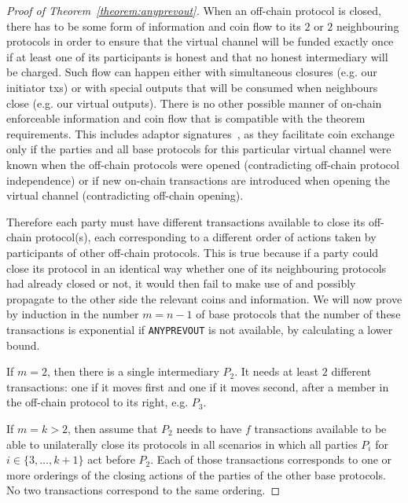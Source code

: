   \begin{proof}[Proof of Theorem~\ref{theorem:anyprevout}]
    When an off-chain protocol is closed, there has to be some form of
    information and coin flow to its $2$ or $2$ neighbouring protocols in order
    to ensure that the virtual channel will be funded exactly once if at least
    one of its participants is honest and that no honest intermediary will be
    charged. Such flow can happen either with simultaneous closures (e.g. our
    initiator txs) or with special outputs that will be consumed when neighbours
    close (e.g. our virtual outputs). There is no other possible manner of
    on-chain enforceable information and coin flow that is compatible with the
    theorem requirements. This includes adaptor
    signatures~\cite{cryptoeprint:2020:476}, as they facilitate coin exchange
    only if the parties and all base protocols for this particular virtual
    channel were known when the off-chain protocols were opened (contradicting
    off-chain protocol independence) or if new on-chain transactions are
    introduced when opening the virtual channel (contradicting off-chain
    opening).

    Therefore each party must have different transactions available to close its
    off-chain protocol(s), each corresponding to a different order of actions
    taken by participants of other off-chain protocols. This is true because if
    a party could close its protocol in an identical way whether one of its
    neighbouring protocols had already closed or not, it would then fail to make
    use of and possibly propagate to the other side the relevant coins and
    information. We will now prove by induction in the number $m = n - 1$ of
    base protocols that the number of these transactions is exponential if
    \texttt{ANYPREVOUT} is not available, by calculating a lower bound.

    If $m = 2$, then there is a single intermediary $P_2$. It needs at least $2$
    different transactions: one if it moves first and one if it moves second,
    after a member in the off-chain protocol to its right, e.g. $P_3$.

    If $m = k > 2$, then assume that $P_2$ needs to have $f$ transactions
    available to be able to unilaterally close its protocols in all scenarios in
    which all parties $P_i$ for $i \in \{3, \dots, k+1\}$ act before $P_2$. Each
    of those transactions corresponds to one or more orderings of the closing
    actions of the parties of the other base protocols. No two transactions
    correspond to the same ordering.


\end{proof}
